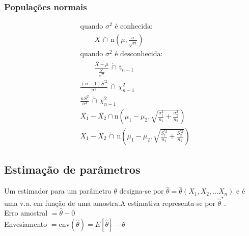 \documentclass[a4paper]{article}
\newcommand{\aproxcap}{\, \mathring{\cap} \,}
\newcommand{\estimador}{\hat{\theta}}
\begin{document}
\begin{multicols}{3}
\subsubsection{Populações normais}
\begin{align*}
  &\text{quando } \sigma^2 \text{ é conhecida:} \\
    &\qquad \overline{X} \aproxcap \text{n}\left(\mu, \frac{\sigma}{\sqrt{n}}\right) \\
  &\text{quando } \sigma^2 \text{ é desconhecida:} \\
    &\qquad \frac{\overline{X} - \mu}{\frac{S'}{\sqrt{n}}} \aproxcap \text{t}_{n-1} \\
  &\frac{(n-1)S^{'2}}{\sigma^2} \aproxcap \chi^2_{n-1} \\
  &\frac{n S^2}{\sigma^2} \aproxcap \chi^2_{n-1} \\
  &\overline{X_1} - \overline{X_2} \cap \text{n}\left(\mu_1 - \mu_2, \sqrt{\frac{\sigma_1^2}{n_1} + \frac{\sigma_2^2}{n_2}}\right) \\
  &\overline{X_1} - \overline{X_2} \aproxcap \text{n}\left(\mu_1 - \mu_2, \sqrt{\frac{S_1^{'2}}{n_1} + \frac{S_2^{'2}}{n_2}}\right)
\end{align*}

\subsection{Estimação de parâmetros}

Um estimador para um parâmetro $\theta$ designa-se por $\estimador = \estimador(X_1, X_2, \ldots X_n)$ e é uma v.a. em função de uma amostra.A estimativa representa-se por $\estimador^*$. \\
Erro amostral $ = \estimador - 0 $\\
Envesiamento $ = \text{env}(\estimador) = E[\estimador] - \theta $\\

\end{multicols}
\end{document}
